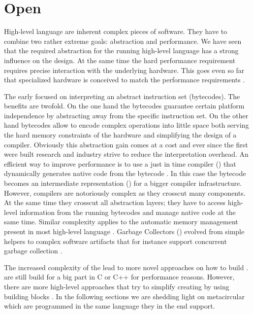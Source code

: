 \section{Open \VMs}

High-level language \VMs are inherent complex pieces of software.
They have to combine two rather extreme goals: abstraction and performance.
We have seen that the required abstraction for the running high-level language has a strong influence on the \VM design.
At the same time the hard performance requirement requires precise interaction with the underlying hardware.
This goes even so far that specialized hardware is conceived to match the performance requirements \cite{Unga84a,Stef84a,McGh98a,Clic05a}.

The early \VMs focused on interpreting an abstract instruction set (bytecodes).
The benefits are twofold.
On the one hand the bytecodes guarantee certain platform independence by abstracting away from the \CPU specific instruction set.
On the other hand bytecodes allow to encode complex operations into little space both serving the hard memory constraints of the hardware and simplifying the design of a compiler.
Obviously this abstraction gain comes at a cost and ever since the first \VMs were built research and industry strive to reduce the interpretation overhead.
An efficient way to improve performance is to use a just in time compiler (\JIT) that dynamically generates native code from the bytecode \cite{Deut84a}.
In this case the bytecode becomes an intermediate representation (\IR) for a bigger compiler infrastructure.
However, \JIT compilers are notoriously complex as they crosscut many \VM components.
At the same time they crosscut all abstraction layers; they have to access high-level information from the running bytecodes and manage native code at the same time.
Similar complexity applies to the automatic memory management present in most high-level language \VMs.
Garbage Collectors (\GC) evolved from simple helpers to complex software artifacts that for instance support concurrent garbage collection \cite{Clic05a}.

The increased complexity of the \VMs lead to more novel approaches on how to build \VMs.
\VMs are still build for a big part in C or C++ for performance reasons.
However, there are more high-level approaches that try to simplify creating \VMs by using building blocks \cite{Geof10a}.
In the following sections we are shedding light on metacircular \VMs which are programmed in the same language they in the end support.

